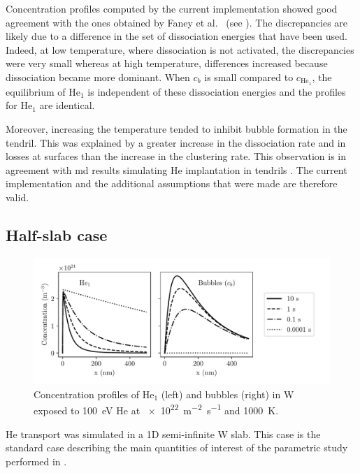 Concentration profiles computed by the current implementation showed good agreement with the ones obtained by Faney et al.\ \cite{faney_spatially_2015} (see ).
The discrepancies are likely due to a difference in the set of dissociation energies that have been used.
Indeed, at low temperature, where dissociation is not activated, the discrepancies were very small whereas at high temperature, differences increased because dissociation became more dominant.
When $c_b$ is small compared to $c_{\mathrm{He}_1}$, the equilibrium of $\mathrm{He}_1$ is independent of these dissociation energies and the profiles for $\mathrm{He}_1$ are identical.

Moreover, increasing the temperature tended to inhibit bubble formation in the \gls{tendril}.
This was explained by a greater increase in the dissociation rate and in losses at surfaces than the increase in the clustering rate.
This observation is in agreement with \gls{md} results simulating He implantation in \glspl{tendril} .
The current implementation and the additional assumptions that were made are therefore valid.

\subsection{Half-slab case} 

\begin{figure}
    \centering
    \includegraphics[width=\linewidth]{Figures/Chapter4/half_slab/profiles_half_slab.pdf}
    \caption{Concentration profiles of He$_1$ (left) and bubbles (right) in W exposed to \SI{100}{eV} He at \SI{e22}{m^{-2}.s^{-1}} and \SI{1000}{K}.}
\end{figure}

\gls{He} transport was simulated in a 1D semi-infinite \gls{W} slab.
This case is the standard case describing the main quantities of interest of the parametric study performed in .

